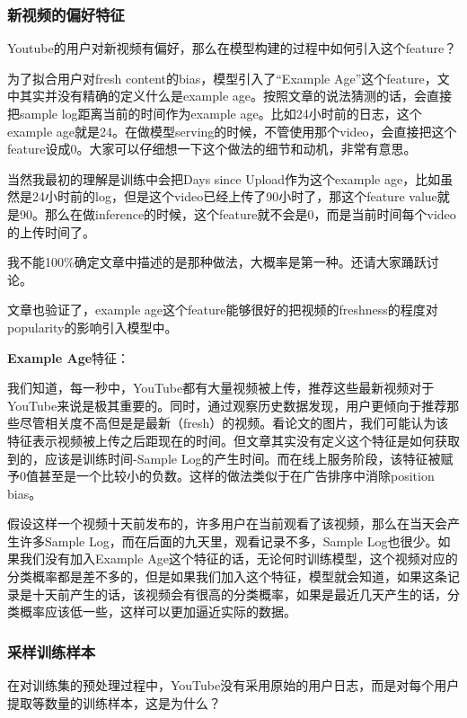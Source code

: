 \documentclass[12pt]{article}
\begin{document}
\subsubsection{新视频的偏好特征}
Youtube的用户对新视频有偏好，那么在模型构建的过程中如何引入这个feature？

为了拟合用户对fresh content的bias，模型引入了“Example Age”这个feature，文中其实并没有精确的定义什么是example age。按照文章的说法猜测的话，会直接把sample log距离当前的时间作为example age。比如24小时前的日志，这个example age就是24。在做模型serving的时候，不管使用那个video，会直接把这个feature设成0。大家可以仔细想一下这个做法的细节和动机，非常有意思。

当然我最初的理解是训练中会把Days since Upload作为这个example age，比如虽然是24小时前的log，但是这个video已经上传了90小时了，那这个feature value就是90。那么在做inference的时候，这个feature就不会是0，而是当前时间每个video的上传时间了。

我不能100\%确定文章中描述的是那种做法，大概率是第一种。还请大家踊跃讨论。

文章也验证了，example age这个feature能够很好的把视频的freshness的程度对popularity的影响引入模型中。

\begin{framed}
\textbf{Example Age}特征\cite{Recommender_System_With_Deep_Learning_Youtube}：

我们知道，每一秒中，YouTube都有大量视频被上传，推荐这些最新视频对于YouTube来说是极其重要的。同时，通过观察历史数据发现，用户更倾向于推荐那些尽管相关度不高但是是最新（fresh）的视频。看论文的图片，我们可能认为该特征表示视频被上传之后距现在的时间。但文章其实没有定义这个特征是如何获取到的，应该是训练时间-Sample Log的产生时间。而在线上服务阶段，该特征被赋予0值甚至是一个比较小的负数。这样的做法类似于在广告排序中消除position bias。

假设这样一个视频十天前发布的，许多用户在当前观看了该视频，那么在当天会产生许多Sample Log，而在后面的九天里，观看记录不多，Sample Log也很少。如果我们没有加入Example Age这个特征的话，无论何时训练模型，这个视频对应的分类概率都是差不多的，但是如果我们加入这个特征，模型就会知道，如果这条记录是十天前产生的话，该视频会有很高的分类概率，如果是最近几天产生的话，分类概率应该低一些，这样可以更加逼近实际的数据。
\end{framed}

\subsubsection{采样训练样本}
在对训练集的预处理过程中，YouTube没有采用原始的用户日志，而是对每个用户提取等数量的训练样本，这是为什么？
\end{document}
